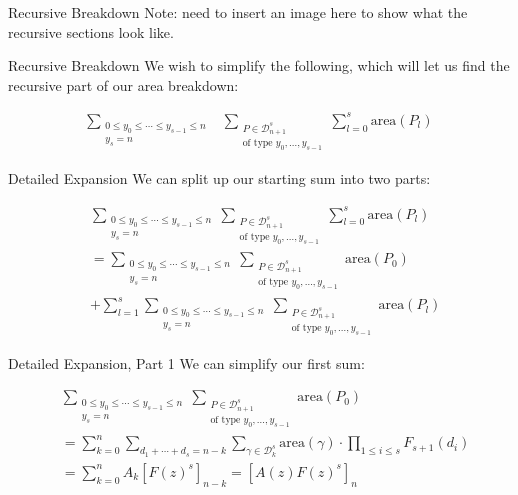 \documentclass{beamer}
\begin{document}
\begin{frame}{Recursive Breakdown}
Note: need to insert an image here to show what the recursive sections look like.
\end{frame}

\begin{frame}{Recursive Breakdown}
We wish to simplify the following, which will let us find the recursive part of our area breakdown:

\begin{align*}
  \sum_{\substack{0\leq y_{0}\leq \cdots\leq y_{s-1}\leq n\\y_{s}=n}} &\sum_{\substack{P\in \mathcal{D}_{n+1}^{s}\\\text{of type }y_{0},\ldots, y_{s-1}}}  \sum_{l=0}^{s} \text{area}(P_{l})
\end{align*}
\end{frame}

\begin{frame}{Detailed Expansion}
We can split up our starting sum into two parts:

\begin{align*}
  & \sum_{\substack{0\leq y_{0}\leq \cdots\leq y_{s-1}\leq n\\y_{s}=n}} \sum_{\substack{P\in \mathcal{D}_{n+1}^{s}\\\text{of type }y_{0},\ldots, y_{s-1}}}  \sum_{l=0}^{s} \text{area}(P_{l}) \\
  & = \sum_{\substack{0\leq y_{0}\leq \cdots\leq y_{s-1}\leq n\\y_{s}=n}} \sum_{\substack{P\in \mathcal{D}_{n+1}^{s}\\\text{of type }y_{0},\ldots, y_{s-1}}} \text{area}(P_{0}) \\ 
  & +\sum_{l=1}^{s} \sum_{\substack{0\leq y_{0}\leq \cdots\leq y_{s-1}\leq n\\y_{s}=n}} \sum_{\substack{P\in \mathcal{D}_{n+1}^{s}\\\text{of type }y_{0},\ldots, y_{s-1}}} \text{area}(P_{l})
\end{align*}
\end{frame}

\begin{frame}{Detailed Expansion, Part 1}
We can simplify our first sum:

\begin{align*}
  & \sum_{\substack{0\leq y_{0}\leq \cdots\leq y_{s-1}\leq n\\y_{s}=n}} \sum_{\substack{P\in \mathcal{D}_{n+1}^{s}\\\text{of type }y_{0},\ldots, y_{s-1}}} \text{area}(P_{0}) \\
  & = \sum_{k=0}^{n}\sum_{d_{1}+\cdots+d_{s}=n-k} \sum_{\gamma\in \mathcal{D}_{k}^{s}}  \text{area}(\gamma)\cdot \prod_{1\leq i\leq s}F_{s+1}(d_{i}) \\
  & = \sum_{k=0}^{n}A_{k}[F(z)^{s}]_{n-k} = [A(z)F(z)^{s}]_{n}
\end{align*}
\end{frame}
\end{document}
